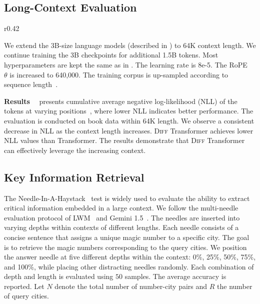 \documentclass{article}
\newcommand{\mypara}[1]{\textbf{#1}~~}
\newcommand\diff{\textsc{Diff} Transformer}
\begin{document}
\subsection{Long-Context Evaluation}
\label{sec:long:eval}


\begin{wrapfigure}{r}{0.42\textwidth}
\vspace{-1.5em}
\centering
\setlength\intextsep{0pt}
\caption{Cumulative average negative log-likelihood (lower is better) on book data.
\diff{} leverages long context more effectively.}
\label{fig:longppl}
\end{wrapfigure}

We extend the 3B-size language models (described in ) to 64K context length.
We continue training the 3B checkpoints for additional 1.5B tokens. Most hyperparameters are kept the same as in .
The learning rate is 8e-5. The RoPE~\citep{rotary} $\theta$ is increased to 640,000.
The training corpus is up-sampled according to sequence length~\citep{length:upsampling}.


\mypara{Results}
 presents cumulative average negative log-likelihood (NLL) of the tokens at varying positions~\citep{gemini1.5}, where lower NLL indicates better performance.
The evaluation is conducted on book data within 64K length.
We observe a consistent decrease in NLL as the context length increases.
\diff{} achieves lower NLL values than Transformer.
The results demonstrate that \diff{} can effectively leverage the increasing context.


\subsection{Key Information Retrieval}
\label{sec:mtnd}

The Needle-In-A-Haystack~\citep{needle} test is widely used to evaluate the ability to extract critical information embedded in a large context.
We follow the multi-needle evaluation protocol of LWM~\citep{lwm} and Gemini 1.5~\citep{gemini1.5}.
The needles are inserted into varying depths within contexts of different lengths.
Each needle consists of a concise sentence that assigns a unique magic number to a specific city.
The goal is to retrieve the magic numbers corresponding to the query cities.
We position the answer needle at five different depths within the context: 0\%, 25\%, 50\%, 75\%, and 100\%, while placing other distracting needles randomly.
Each combination of depth and length is evaluated using $50$ samples.
The average accuracy is reported.
Let $N$ denote the total number of number-city pairs and $R$ the number of query cities.
\end{document}
